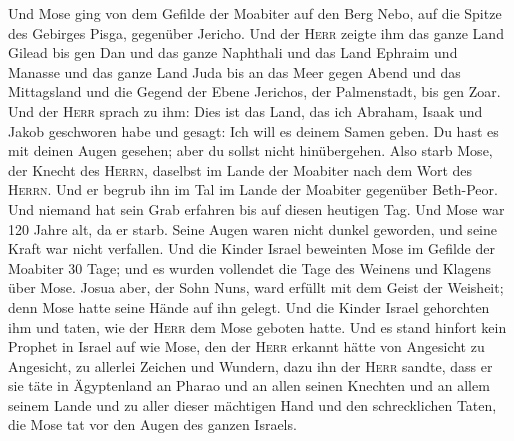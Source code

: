  Und Mose ging von dem Gefilde der Moabiter auf den Berg
Nebo, auf die Spitze des Gebirges Pisga, gegenüber Jericho. Und der
\textsc{Herr} zeigte ihm das ganze Land Gilead bis gen Dan
 und das ganze Naphthali und das Land Ephraim und Manasse
und das ganze Land Juda bis an das Meer gegen Abend  und
das Mittagsland und die Gegend der Ebene Jerichos, der Palmenstadt, bis
gen Zoar.  Und der \textsc{Herr} sprach zu ihm: Dies ist
das Land, das ich Abraham, Isaak und Jakob geschworen habe und gesagt:
Ich will es deinem Samen geben. Du hast es mit deinen Augen gesehen;
aber du sollst nicht hinübergehen.  Also starb Mose, der
Knecht des \textsc{Herrn}, daselbst im Lande der Moabiter nach dem Wort
des \textsc{Herrn}.  Und er begrub ihn im Tal im Lande der
Moabiter gegenüber Beth-Peor. Und niemand hat sein Grab erfahren bis auf
diesen heutigen Tag.  Und Mose war 120 Jahre alt, da er
starb. Seine Augen waren nicht dunkel geworden, und seine Kraft war
nicht verfallen.  Und die Kinder Israel beweinten Mose im
Gefilde der Moabiter 30 Tage; und es wurden vollendet die Tage des
Weinens und Klagens über Mose.  Josua aber, der Sohn Nuns,
ward erfüllt mit dem Geist der Weisheit; denn Mose hatte seine Hände auf
ihn gelegt. Und die Kinder Israel gehorchten ihm und taten, wie der
\textsc{Herr} dem Mose geboten hatte.  Und es stand
hinfort kein Prophet in Israel auf wie Mose, den der \textsc{Herr}
erkannt hätte von Angesicht zu Angesicht,  zu allerlei
Zeichen und Wundern, dazu ihn der \textsc{Herr} sandte, dass er sie täte
in Ägyptenland an Pharao und an allen seinen Knechten und an allem
seinem Lande  und zu aller dieser mächtigen Hand und den
schrecklichen Taten, die Mose tat vor den Augen des ganzen Israels.
